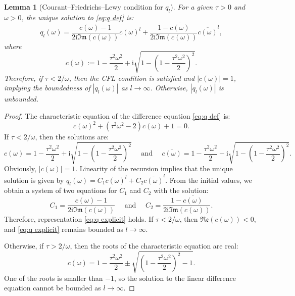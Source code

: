 \documentclass[a4paper,11pt,bibliography=totoc,listof=totoc,headinclude=true,cleardoublepage=empty,oneside]{scrbook}
\newtheorem{lemma}[theorem]{Lemma}
\renewcommand{\i}{\mathrm{i}}
\renewcommand{\Im}{\mathfrak{Im}}
\renewcommand{\Re}{\mathfrak{Re}}
\begin{document}
\begin{lemma}[Courant--Friedrichs--Lewy condition for $q_l$]\label{lemma:cfl}
    For a given $\tau > 0$ and $\omega > 0$, the unique solution to \eqref{eq:q def} is:
    \begin{equation}\label{eq:q explicit}
        q_l(\omega) =  \frac{c(\omega)-1}{2\i \Im(c(\omega))} c(\omega)^l + \frac{1 - \overline{c(\omega)}}{2\i \Im(c(\omega))}  \overline{c(\omega)}^l,
    \end{equation}
    where 
    \begin{equation*}
        c(\omega) := 1 - \frac{\tau^2 \omega^2}{2} + \i \sqrt{1 - \left(1 - \frac{\tau^2 \omega^2}{2}\right)^2}.
    \end{equation*}
    Therefore, if $\tau < 2/\omega$, then the CFL condition is satisfied and $|c(\omega)|=1$, implying the boundedness of $|q_l(\omega)|$ as $l \rightarrow \infty$. Otherwise, $|q_l(\omega)|$ is unbounded.
\end{lemma}
\begin{proof}
    The characteristic equation of the difference equation \eqref{eq:q def} is:
    \begin{equation*}
        c(\omega)^2 + (\tau^2\omega^2 - 2)c(\omega) + 1 = 0. 
    \end{equation*}
    If $\tau < 2/\omega$, then the solutions are:
    \begin{equation*}
        c(\omega) = 1 - \frac{\tau^2 \omega^2}{2} + \i \sqrt{1 - \left(1 - \frac{\tau^2 \omega^2}{2}\right)^2} \quad \text{ and } \quad \overline{c(\omega)} = 1 - \frac{\tau^2 \omega^2}{2} - \i \sqrt{1 - \left(1 - \frac{\tau^2 \omega^2}{2}\right)^2}.
    \end{equation*}
     Obviously, $|c(\omega)|=1$. Linearity of the recursion implies that the unique solution is given by $q_l(\omega) = C_1 c(\omega)^l + C_2 \overline{c(\omega)}^l$. From the initial values, we obtain a system of two equations for $C_1$ and $C_2$ with the solution:
    \begin{equation*}
        C_1 = \frac{c(\omega)-1}{2\i \Im(c(\omega))} \quad \text{ and } \quad C_2 = \frac{1 - \overline{c(\omega)}}{2\i \Im(c(\omega))}.
    \end{equation*}
    Therefore, representation \eqref{eq:q explicit} holds. If $\tau < 2/\omega$, then $\Re(c(\omega)) < 0$, and \eqref{eq:q explicit} remains bounded as $l\rightarrow \infty$. 
    
    Otherwise, if $\tau > 2/\omega$, then the roots of the characteristic equation are real:
    \begin{equation*}
        c(\omega) = 1 - \frac{\tau^2 \omega^2}{2} \pm \sqrt{\left(1 - \frac{\tau^2 \omega^2}{2}\right)^2 -1 }.
    \end{equation*}
    One of the roots is smaller than $-1$, so the solution to the linear difference equation cannot be bounded as $l\rightarrow\infty$.
\end{proof}
\end{document}
